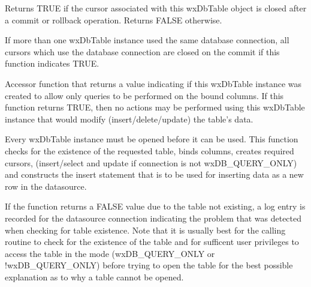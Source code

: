 Returns TRUE if the cursor associated with this wxDbTable object is closed
after a commit or rollback operation.  Returns FALSE otherwise.


If more than one wxDbTable instance used the same database connection, all cursors
which use the database connection are closed on the commit if this function
indicates TRUE.

\label{wxdbtableisqueryonly}


Accessor function that returns a value indicating if this wxDbTable instance
was created to allow only queries to be performed on the bound columns.  If
this function returns TRUE, then no actions may be performed using this
wxDbTable instance that would modify (insert/delete/update) the table's data.

\label{wxdbtableopen}


Every wxDbTable instance must be opened before it can be used.  This function
checks for the existence of the requested table, binds columns, creates required
cursors, (insert/select and update if connection is not wxDB\_QUERY\_ONLY) and
constructs the insert statement that is to be used for inserting data as a new
row in the datasource.





If the function returns a FALSE value due to the table not existing, a log
entry is recorded for the datasource connection indicating the problem
that was detected when checking for table existence.  Note that it is usually
best for the calling routine to check for the existence of the table and for
sufficent user privileges to access the table in the mode (wxDB\_QUERY\_ONLY or
!wxDB\_QUERY\_ONLY) before trying to open the table for the best possible
explanation as to why a table cannot be opened.

